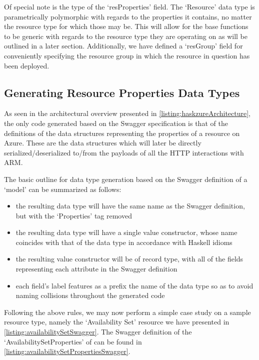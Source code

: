 \documentclass[11pt]{report}
\begin{document}
Of special note is the type of the `resProperties' field. The `Resource'
data type is parametrically polymorphic with regards to the properties it
contains, no matter the resource type for which those may be. This will allow
for the base functions to be generic with regards to the resource type they
are operating on as will be outlined in a later section. Additionally, we have
defined a `resGroup' field for conveniently specifying the resource group in which
the resource in question has been deployed.

\subsection{Generating Resource Properties Data Types}

As seen in the architectural overview presented in
\autoref{listing:haskzureArchitecture}, the only code generated based on the
Swagger specification is that of the definitions of the data structures
representing the properties of a resource on Azure. These are the data structures
which will later be directly serialized/deserialized to/from the payloads of
all the HTTP interactions with ARM. \newline

The basic outline for data type generation based on the Swagger definition of a
`model' can be summarized as follows:

\begin{itemize}
    \item{} the resulting data type will have the same name as the Swagger
        definition, but with the `Properties' tag removed
    \item{} the resulting data type will have a single value constructor, whose
        name coincides with that of the data type in accordance with Haskell
        idioms
    \item{} the resulting value constructor will be of record type, with all of
        the fields representing each attribute in the Swagger definition
    \item{} each field's label features as a prefix the name of the data type so
        as to avoid naming collisions throughout the generated code
\end{itemize}

Following the above rules, we may now perform a simple case study on a sample
resource type, namely the `Availability Set' resource we have presented in
\autoref{listing:availabilitySetSwagger}. The Swagger definition of the
`AvailabilitySetProperties' of can be found in
\autoref{listing:availabilitySetPropertiesSwagger}.
\end{document}
